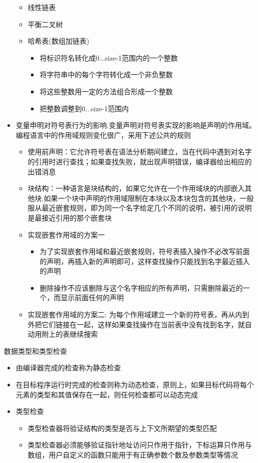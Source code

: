 \documentclass[utf8]{ctexart}
\begin{document}
\begin{itemize}
\begin{itemize}
        \item 线性链表
        \item 平衡二叉树
        \item 哈希表(数组加链表)
        \begin{itemize}
            \item 将标识符名转化成0...size-1范围内的一个整数
            \item 将字符串中的每个字符转化成一个非负整数
            \item 将这些整数用一定的方法组合形成一个整数
            \item 把整数调整到0...size-1范围内
        \end{itemize}
    \end{itemize}  
    \item 变量申明对符号表行为的影响.变量声明对符号表实现的影响是声明的作用域。编程语言中的作用域规则变化很广，采用下述公共的规则
    \begin{itemize}
        \item 使用前声明：它允许符号表在语法分析期间建立，当在代码中遇到对名字的引用时进行查找；如果查找失败，就出现声明错误，编译器给出相应的出错消息
        \item 块结构：一种语言是块结构的，如果它允许在一个作用域块的内部嵌入其他块.如果一个块中声明的作用域限制在本块以及本块包含的其他块，一般服从最近嵌套规则，即为同一个名字给定几个不同的说明，被引用的说明是最接近引用的那个嵌套块
        \item 实现嵌套作用域的方案一
        \begin{itemize}
            \item 为了实现嵌套作用域和最近嵌套规则，符号表插入操作不必改写前面的声明，再插入新的声明即可，这样查找操作只能找到名字最近插入的声明
            \item 删除操作不应该删除与这个名字相应的所有声明，只需删除最近的一个，而显示前面任何的声明
        \end{itemize}
        \item 实现嵌套作用域的方案二:
        为每个作用域建立一个新的符号表，再从内到外把它们链接在一起，这样如果查找操作在当前表中没有找到名字，就自动用附上的表继续搜索

    \end{itemize}
\end{itemize}

\noindent 数据类型和类型检查
\begin{itemize}
    \item 由编译器完成的检查称为静态检查
    \item 在目标程序运行时完成的检查则称为动态检查，原则上，如果目标代码将每个元素的类型和其值保存在一起，则任何检查都可以动态完成
    \item 类型检查
    \begin{itemize}
        \item 类型检查器将验证结构的类型是否与上下文所期望的类型匹配
        \item 类型检查器必须能够验证指针地址访问只作用于指针，下标运算只作用与数组，用户自定义的函数只能用于有正确参数个数及参数类型等情况
    \end{itemize}
\end{itemize}
\end{document}
